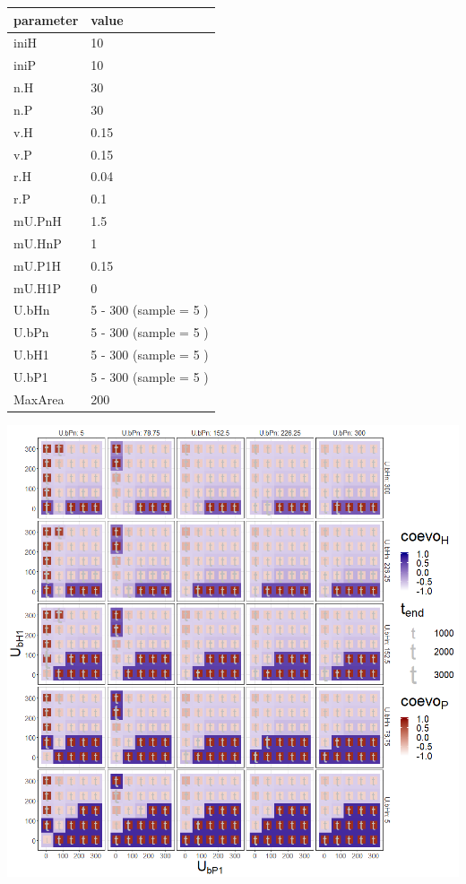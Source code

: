 \documentclass[]{book}
\begin{document}
\begin{tabular}{l|l}
\hline
parameter & value\\
\hline
iniH & 10\\
\hline
iniP & 10\\
\hline
n.H & 30\\
\hline
n.P & 30\\
\hline
v.H & 0.15\\
\hline
v.P & 0.15\\
\hline
r.H & 0.04\\
\hline
r.P & 0.1\\
\hline
mU.PnH & 1.5\\
\hline
mU.HnP & 1\\
\hline
mU.P1H & 0.15\\
\hline
mU.H1P & 0\\
\hline
U.bHn & 5 - 300 (sample = 5 )\\
\hline
U.bPn & 5 - 300 (sample = 5 )\\
\hline
U.bH1 & 5 - 300 (sample = 5 )\\
\hline
U.bP1 & 5 - 300 (sample = 5 )\\
\hline
MaxArea & 200\\
\hline
\end{tabular}

\newpage

\includegraphics[width=1\linewidth]{plots/4_fourPar-U.bH-U.bP_plot}
\end{document}
